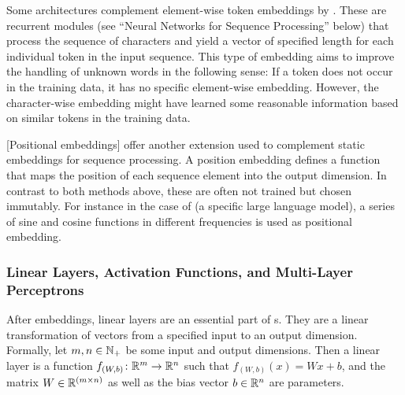 \documentclass[../document.tex]{subfiles}
\begin{document}
    Some architectures complement element-wise token embeddings by  \citep[e.g.\@][]{kiperwasser2016simple,Akb18}.
    These are recurrent modules (see ``Neural Networks for Sequence Processing'' below) that process the sequence of characters and yield a vector of specified length for each individual token in the input sequence.
    This type of embedding aims to improve the handling of unknown words in the following sense:
        If a token does not occur in the training data, it has no specific element-wise embedding.
        However, the character-wise embedding might have learned some reasonable information based on similar tokens in the training data.

    [Positional embeddings] offer another extension used to complement static embeddings for sequence processing.
    A position embedding defines a function that maps the position of each sequence element into the output dimension.
    In contrast to both methods above, these are often not trained but chosen immutably.
    For instance in the case of  (a specific large language model), a series of sine and cosine functions in different frequencies is used as positional embedding.

    \subsubsection{Linear Layers, Activation Functions, and Multi-Layer Perceptrons}
    After embeddings, linear layers are an essential part of s.
    They are a linear transformation of vectors from a specified input to an output dimension.
    Formally, let \(m, n \in \mathbb{N}_+\) be some input and output dimensions.
    Then a linear layer is a function \(f_{(W,b)}\colon \mathbb{R}^m \to \mathbb{R}^n\) such that \(f_{(W,b)}(x) = Wx+b\), and the matrix \(W \in \mathbb{R}^{(m\times n)}\) as well as the bias vector \(b\in \mathbb{R}^n\) are parameters.
\end{document}
